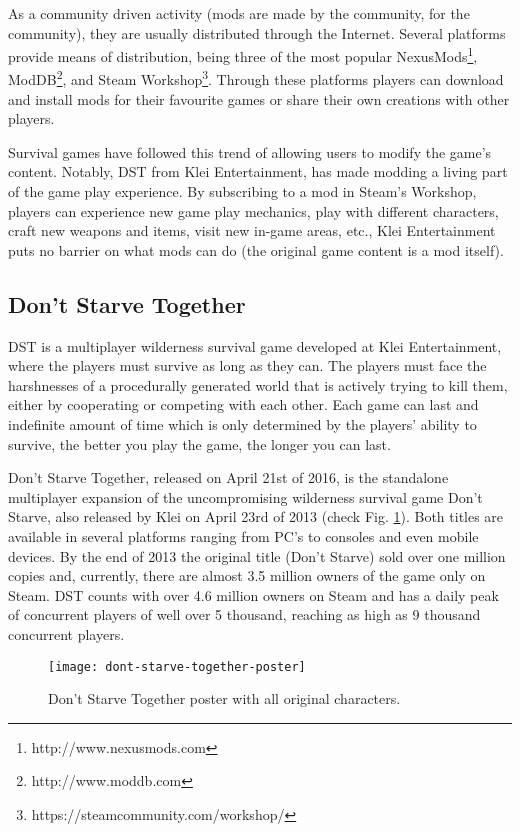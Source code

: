 As a community driven activity (mods are made by the community, for the community), they are usually distributed through the Internet.
Several platforms provide means of distribution, being three of the most popular NexusMods\footnote{http://www.nexusmods.com}, ModDB\footnote{http://www.moddb.com}, and Steam Workshop\footnote{https://steamcommunity.com/workshop/}.
Through these platforms players can download and install mods for their favourite games or share their own creations with other players.

Survival games have followed this trend of allowing users to modify the game's content.
Notably, \ac{DST} from Klei Entertainment, has made modding a living part of the game play experience.
By subscribing to a mod in Steam's Workshop, players can experience new game play mechanics, play with different characters, craft new weapons and items, visit new in-game areas, etc., Klei Entertainment puts no barrier on what mods can do (the original game content is a mod itself).


\subsection{Don't Starve Together}
\ac{DST} is a multiplayer wilderness survival game developed at Klei Entertainment, where the players must survive as long as they can.
The players must face the harshnesses of a procedurally generated world that is actively trying to kill them, either by cooperating or competing with each other.
Each game can last and indefinite amount of time which is only determined by the players' ability to survive, the better you play the game, the longer you can last.

Don't Starve Together, released on April 21st of 2016, is the standalone multiplayer expansion of the uncompromising wilderness survival game Don't Starve, also released by Klei on April 23rd of 2013 (check Fig. \ref{fig:don't-starve-together-poster}).
Both titles are available in several platforms ranging from PC's to consoles and even mobile devices.
By the end of 2013 the original title (Don't Starve) sold over one million copies and, currently, there are almost 3.5 million owners of the game only on Steam.
\ac{DST} counts with over 4.6 million owners on Steam and has a daily peak of concurrent players of well over 5 thousand, reaching as high as 9 thousand concurrent players.

\begin{figure}
  \centering
    \texttt{[image: dont-starve-together-poster]}
  \caption{Don't Starve Together poster with all original characters.}
  \label{fig:don't-starve-together-poster}
\end{figure}

